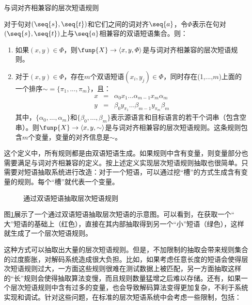 \vspace{0.5em}
\begin{definition} 与词对齐相兼容的层次短语规则

{\small
对于句对$(\seq{s},\seq{t})$和它们之间的词对齐$\seq{a}$，令$\varPhi$表示在句对$(\seq{s},\seq{t})$上与$\seq{a}$相兼容的双语短语集合。则：
\begin{enumerate}
\item 	如果$(x,y)\in \varPhi$，则$\funp{X} \to \langle x,y,\varPhi \rangle$是与词对齐相兼容的层次短语规则。
\item 	对于$(x,y)\in \varPhi$，存在$m$个双语短语$(x_i,y_j)\in \varPhi$，同时存在(1,$...$,$m$)上面的一个排序$\sim = \{\pi_1 , ... ,\pi_m\}$，且：
\vspace{-1.5em}
\begin{eqnarray}
x&=&\alpha_0 x_1 ... \alpha_{m-1} x_m \alpha_m \label{eq:8-2}\\
y&=&\beta_0 y_{\pi_1}  ... \beta_{m-1} y_{\pi_m} \beta_m
\label{eq:8-3}
\end{eqnarray}
其中，$\{\alpha_0, ... ,\alpha_m \}$和$\{\beta_0, ... ,\beta_m \}$表示源语言和目标语言的若干个词串（包含空串）。则$\funp{X} \to \langle x,y,\sim \rangle$是与词对齐相兼容的层次短语规则。这条规则包含$m$个变量，变量的对齐信息是$\sim$。
\end{enumerate}
}
\end{definition}

\parinterval 这个定义中，所有规则都是由双语短语生成。如果规则中含有变量，则变量部分也需要满足与词对齐相兼容的定义。按上述定义实现层次短语规则抽取也很简单。只需要对短语抽取系统进行改造：对于一个短语，可以通过挖“槽”的方式生成含有变量的规则。每个“槽”就代表一个变量。

\begin{figure}[htp]
\centering

\caption{通过双语短语抽取层次短语规则}
\label{fig:8-7}
\end{figure}

\parinterval 图\ref{fig:8-7}展示了一个通过双语短语抽取层次短语的示意图。可以看到，在获取一个“ 大”短语的基础上（红色），直接在其内部抽取得到另一个“小”短语（绿色），这样就生成了一个层次短语规则。

\parinterval 这种方式可以抽取出大量的层次短语规则。但是，不加限制的抽取会带来规则集合的过度膨胀，对解码系统造成很大负担。比如，如果考虑任意长度的短语会使得层次短语规则过大，一方面这些规则很难在测试数据上被匹配，另一方面抽取这样的“长”规则会使得抽取算法变慢，而且规则数量猛增之后难以存储。还有，如果一个层次短语规则中含有过多的变量，也会导致解码算法变得更加复杂，不利于系统实现和调试。针对这些问题，在标准的层次短语系统中会考虑一些限制，包括：

